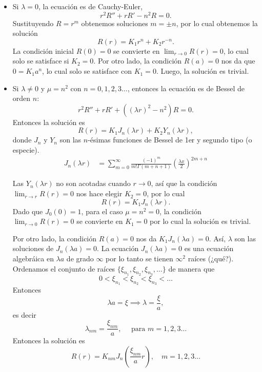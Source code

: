 \documentclass[11pt,letterpaper,draft]{report}
\theoremstyle{plain}
\theoremstyle{definition}
\theoremstyle{remark}
\newcommand\<{\langle}
\renewcommand\>{\rangle}
\begin{document}
\begin{itemize}
  \item Si $\lambda=0$, la ecuación es de Cauchy-Euler,
    \[
      r^{2}R''+rR'-n^{2}R = 0
    .\]
    Sustituyendo $R=r^m$ obtenemos soluciones $m=\pm n$, por lo
    cual obtenemos la solución
    \[
      R(r) = K_1r^n+K_2r^{-n}
    .\]
    La condición inicial $R(0)=0$ se convierte en $\lim_{r\to
    0}R(r)=0$, lo cual solo se satisface si $K_2=0$.
    Por otro lado, la condición $R(a)=0$ nos da que $0=K_1a^n$,
    lo cual solo se satisface con $K_1=0$.
    Luego, la solución es trivial.

  \item Si $\lambda\neq 0$ y $\mu=n^{2}$ con
    $n=0,1,2,3\dots$, entonces la ecuación es de
    Bessel de orden $n$:
    \[
      r^{2}R'' +rR' +((\lambda r)^{2}-n^{2})R = 0
    .\]
    Entonces la solución es
    \[
      R(r)
      =
      K_1J_n(\lambda r)
      +
      K_2Y_n(\lambda r)
    ,\]
    donde $J_n$ y $Y_n$ son las $n$-ésimas funciones de
    Bessel de 1er y segundo tipo (o especie).
    \begin{align*}
      J_n(\lambda r)
      &= \sum_{m=0}^{\infty}\frac{(-1)^m}{m!\Gamma(m+n+1)}
      \left(
        \frac{\lambda x}{2}
      \right)^{2m+n}
    \end{align*}

    Las $Y_n(\lambda r)$ no son acotadas cuando $r\to 0$,
    así que la condición $\lim_{r\to r}R(r)=0$ nos hace
    elegir $K_2=0$, por lo cual
    \[
      R(r)=K_1J_n(\lambda r)
    .\]
    Dado que $J_0(0) = 1$, para el caso $\mu = n^2 = 0$, la condición
    $\lim_{r\to 0} R(r) = 0$ se convierte en $K_1 = 0$ por lo cual la
    solución es trivial.
    
    Por otro lado, la condición $R(a)=0$ nos da
    $K_1J_n(\lambda a)=0$.
    Así, $\lambda$ son las soluciones de $J_n(\lambda a)=0$.
    La ecuación $J_n(\lambda a) = 0$ es una ecuación algebráica en
    $\lambda a$ de grado $\infty$ por lo tanto se tienen $\infty^2$
    raíces (¿qué?). Ordenamos el conjunto de raíces
    $\{ \xi_{n_1}, \xi_{n_2}, \xi_{n_3}, \dots\}$ de manera que
    \[
      0 < \xi_{n_1} < \xi_{n_2} < \xi_{n_3} < \dots
    \] Entonces
    \[
    \lambda a = \xi \implies \lambda = \frac{\xi}{a},
    \] es decir
    \[
      \lambda_{nm} = \frac{\xi_{nm}}{a}, \quad \text{ para } m = 1,2,3\dots
    \] Entonces la solución es
    \[
      R(r) = K_{nm} J_n\left(\frac{\xi_{nm}}{a}r\right), \quad m = 1,2,3 \dots
    \] 
\end{itemize}
\end{document}
